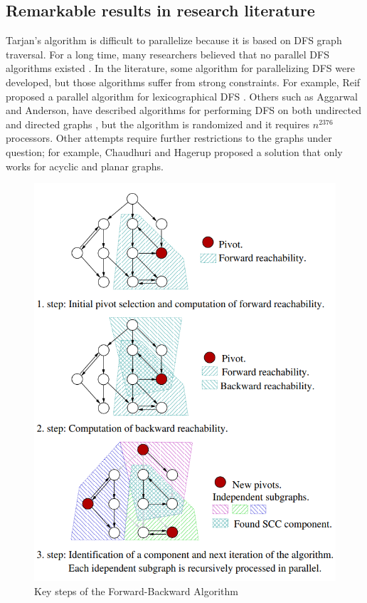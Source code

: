 \subsection{Remarkable results in research literature}
Tarjan's algorithm is difficult to parallelize because it is based on DFS graph traversal. For a long time, many researchers believed that no parallel DFS algorithms existed \cite{history-of-parallel-dfs-algorithms}. In the literature, some algorithm for parallelizing DFS were developed, but those algorithms suffer from strong constraints. For example, Reif proposed a parallel algorithm for lexicographical DFS \cite{reif}. Others such as Aggarwal and Anderson, have described algorithms for performing DFS on both undirected and directed graphs \cite{Aggarwal}, but the algorithm is randomized and it requires $n^{2376}$ processors. Other attempts require further restrictions to the graphs under question; for example, Chaudhuri and Hagerup proposed a solution that only works for acyclic and planar graphs. 

\begin{figure}
  \begin{center}
    \includegraphics[scale=0.5]{img/fb-algorithm.png}
  \end{center}
  \caption{Key steps of the Forward-Backward Algorithm}
  \label{img:fb-algorithm}
\end{figure}

